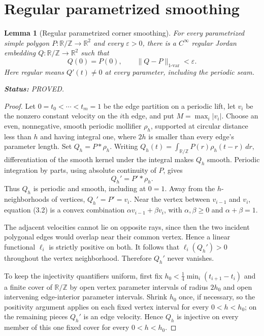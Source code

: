 \documentclass[11pt]{article}
\newtheorem{lemma}[theorem]{Lemma}
\theoremstyle{definition}
\theoremstyle{remark}
\newcommand{\R}{\mathbb R}
\newcommand{\T}{\mathbb R/\mathbb Z}
\newcommand{\status}[1]{\par\smallskip\noindent\textbf{Status:}
  \begingroup\small\sffamily #1.\endgroup\par\smallskip}
\begin{document}
\section{Regular parametrized smoothing}

\begin{lemma}[Regular parametrized corner smoothing]\label{lem:smooth}
For every parametrized simple polygon $P\colon\T\to\R^2$ and every
$\varepsilon>0$, there is a $C^\infty$ \emph{regular} Jordan embedding
$Q\colon\T\to\R^2$ such that
\[
 Q(0)=P(0),\qquad
 \|Q-P\|_{1\text{-var}}<\varepsilon.                   \tag{3.1}
\]
Here regular means $Q'(t)\ne0$ at every parameter, including the periodic
seam.
\status{PROVED}
\end{lemma}

\begin{proof}
Let $0=t_0<\cdots<t_m=1$ be the edge partition on a periodic lift, let
$v_i$ be the nonzero constant velocity on the $i$th edge, and put
$M=\max_i|v_i|$.  Choose an even, nonnegative, smooth periodic mollifier
$\rho_h$, supported at circular distance less than $h$ and having integral
one, where $2h$ is smaller than every edge's parameter length.  Set
$Q_h=P*\rho_h$.  Writing
\(
Q_h(t)=\int_{\T}P(r)\rho_h(t-r)\,dr,
\)
differentiation of the smooth kernel under the integral makes $Q_h$ smooth.
Periodic integration by parts, using absolute continuity of $P$, gives
\[
 Q_h'=P'*\rho_h.                                       \tag{3.2}
\]
Thus $Q_h$ is periodic and smooth, including at $0=1$.  Away from the
$h$-neighborhoods of vertices, $Q_h'=P'=v_i$.  Near the vertex between
$v_{i-1}$ and $v_i$, equation (3.2) is a convex combination
$\alpha v_{i-1}+\beta v_i$, with $\alpha,\beta\geq0$ and
$\alpha+\beta=1$.

The adjacent velocities cannot lie on opposite rays, since then the two
incident polygonal edges would overlap near their common vertex.  Hence a
linear functional $\ell_i$ is strictly positive on both.  It follows that
$\ell_i(Q_h')>0$ throughout the vertex neighborhood.  Therefore $Q_h'$ never
vanishes.

To keep the injectivity quantifiers uniform, first fix
$h_0<\tfrac14\min_i(t_{i+1}-t_i)$ and a finite cover of $\T$ by open vertex
parameter intervals of radius $2h_0$ and open intervening edge-interior
parameter intervals.  Shrink
$h_0$ once, if necessary, so the positivity argument applies on each fixed
vertex interval for every $0<h<h_0$; on the remaining pieces $Q_h'$ is an
edge velocity.  Hence $Q_h$ is injective on every member of this one fixed
cover for every $0<h<h_0$.


\end{proof}
\end{document}

